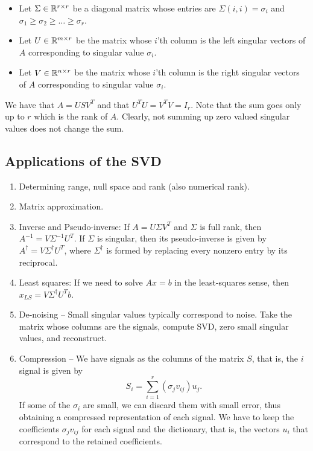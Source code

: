\documentclass{article}
\begin{document}
\begin{itemize}
\item Let $\Sigma \in {\mathbb{R}}^{r \times r}$ be a diagonal matrix whose entries are $\Sigma(i,i) = \sigma_i$ and $\sigma_1 \ge \sigma_2 \ge \ldots \ge \sigma_r$.
\item Let $U \in {\mathbb{R}}^{m \times r}$ be the matrix whose $i$'th column is the left singular vectors of $A$ corresponding to singular value $\sigma_i$.
\item Let $V \in {\mathbb{R}}^{n \times r}$ be the matrix whose $i$'th column is the right singular vectors of $A$ corresponding to singular value $\sigma_i$.
\end{itemize}
We have that $A = USV^T$ and that $U^{T}U = V^{T}V = I_r$. Note that the sum goes only up to $r$ which is the rank of $A$. Clearly, not summing up zero valued singular values does not change the sum.

\subsection*{Applications of the SVD}
\begin{enumerate}
\item Determining range, null space and rank (also numerical rank).
\item Matrix approximation.
\item Inverse and Pseudo-inverse: If $A=U \Sigma V^{T}$ and $\Sigma$
is full rank, then $A^{-1}=V \Sigma^{-1} U^{T}$. If $\Sigma$ is
singular, then its pseudo-inverse is given by $A^{\dagger}=V
\Sigma^{\dagger} U^{T}$, where $\Sigma^{\dagger}$ is formed by
replacing every nonzero entry by its reciprocal.
\item Least squares: If we need to solve $Ax=b$ in the least-squares
sense, then $x_{LS}=V \Sigma^{\dagger} U^{T} b$.
\item De-noising -- Small singular values typically correspond to
noise. Take the matrix whose columns are the signals, compute SVD,
zero small singular values, and reconstruct.
\item Compression -- We have signals as the columns of the matrix
$S$, that is, the $i$ signal is given by
\begin{equation*}
S_{i} = \sum_{i=1}^{r} \left ( \sigma_{j} v_{ij} \right ) u_{j}.
\end{equation*}
If some of the $\sigma_{i}$ are small, we can discard them with
small error, thus obtaining a compressed representation of each
signal. We have to keep the coefficients $\sigma_{j} v_{ij}$ for
each signal and the dictionary, that is, the vectors $u_{i}$ that
correspond to the retained coefficients.
\end{enumerate}
\end{document}
